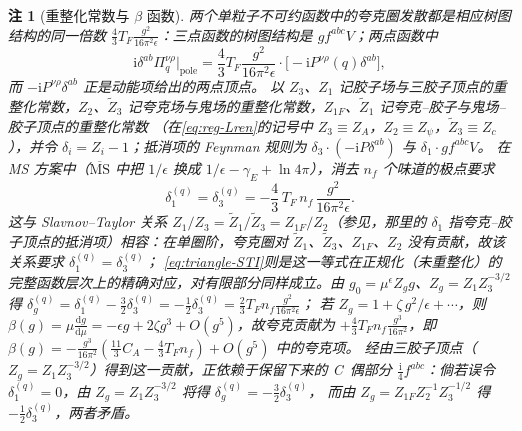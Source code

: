 \documentclass[UTF8,a4paper,11pt,fontset=fandol]{ctexart}
\theoremstyle{cplain}
\theoremstyle{cdefinition}
\theoremstyle{cremark}
\newtheorem{remark}[theorem]{注}
\numberwithin{equation}{section}
\newcommand{\dd}{\mathrm{d}}                         %
\newcommand{\ii}{\mathrm{i}}                        %
\begin{document}
\begin{remark}[重整化常数与 $\beta$ 函数]\label{rem:tri-renorm}
两个单粒子不可约函数中的夸克圈发散都是相应树图结构的同一倍数 $\frac43T_F\frac{g^2}{16\pi^2\epsilon}$：三点函数的树图结构是 $g f^{abc}V$；两点函数中
\[
\ii\delta^{ab}\Pi_q^{\nu\rho}\big|_{\mathrm{pole}}=\frac43T_F\frac{g^2}{16\pi^2\epsilon}\cdot\bigl[-\ii P^{\nu\rho}(q)\delta^{ab}\bigr],
\]
而 $-\ii P^{\nu\rho}\delta^{ab}$ 正是动能项给出的两点顶点。
以 $Z_3$、$Z_1$ 记胶子场与三胶子顶点的重整化常数，$Z_2$、$\tilde Z_3$ 记夸克场与鬼场的重整化常数，$Z_{1F}$、$\tilde Z_1$ 记夸克--胶子与鬼场--胶子顶点的重整化常数
（在\cref{eq:reg-Lren}的记号中 $Z_3\equiv Z_A$，$Z_2\equiv Z_\psi$，$\tilde Z_3\equiv Z_c$），并令 $\delta_i=Z_i-1$；抵消项的 Feynman 规则为 $\delta_3\cdot(-\ii P\delta^{ab})$ 与 $\delta_1\cdot g f^{abc}V$。
在 MS 方案中（$\overline{\mathrm{MS}}$ 中把 $1/\epsilon$ 换成 $1/\epsilon-\gamma_E+\ln4\pi$），消去 $n_f$ 个味道的极点要求
\begin{equation}\label{eq:tri-delta}
\delta_1^{(q)}=\delta_3^{(q)}=-\frac43\,T_F\,n_f\,\frac{g^2}{16\pi^2\epsilon}.
\end{equation}
这与 Slavnov--Taylor 关系 $Z_1/Z_3=\tilde Z_1/\tilde Z_3=Z_{1F}/Z_2$（参见\cite[第~16~章]{PeskinSchroeder1995}，那里的 $\delta_1$ 指夸克--胶子顶点的抵消项）相容：在单圈阶，夸克圈对 $\tilde Z_1$、$\tilde Z_3$、$Z_{1F}$、$Z_2$ 没有贡献，故该关系要求 $\delta_1^{(q)}=\delta_3^{(q)}$；
\cref{eq:triangle-STI}则是这一等式在正规化（未重整化）的完整函数层次上的精确对应，对有限部分同样成立。由 $g_0=\mu^\epsilon Z_gg$、$Z_g=Z_1Z_3^{-3/2}$ 得 $\delta_g^{(q)}=\delta_1^{(q)}-\frac32\delta_3^{(q)}=-\frac12\delta_3^{(q)}=\frac23T_Fn_f\frac{g^2}{16\pi^2\epsilon}$；
若 $Z_g=1+\zeta\,g^2/\epsilon+\cdots$，则 $\beta(g)=\mu\frac{\dd g}{\dd\mu}=-\epsilon g+2\zeta g^3+O(g^5)$，故夸克贡献为 $+\frac43T_Fn_f\frac{g^3}{16\pi^2}$，即 $\beta(g)=-\frac{g^3}{16\pi^2}(\frac{11}{3}C_A-\frac43T_Fn_f)+O(g^5)$ 中的夸克项\cite{PeskinSchroeder1995}。
经由三胶子顶点（$Z_g=Z_1Z_3^{-3/2}$）得到这一贡献，正依赖于保留下来的 C~偶部分 $\frac{\ii}{4}f^{abc}$：倘若误令 $\delta_1^{(q)}=0$，由 $Z_g=Z_1Z_3^{-3/2}$ 将得 $\delta_g^{(q)}=-\frac32\delta_3^{(q)}$，
而由 $Z_g=Z_{1F}Z_2^{-1}Z_3^{-1/2}$ 得 $-\frac12\delta_3^{(q)}$，两者矛盾。
\end{remark}
\end{document}
